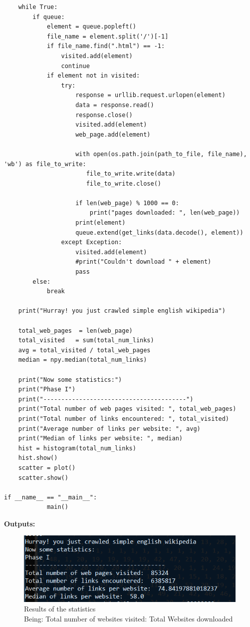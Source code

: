 \documentclass{WeSTassignment}
\begin{document}
\begin{lstlisting}
    while True:
        if queue:
            element = queue.popleft()
            file_name = element.split('/')[-1]
            if file_name.find(".html") == -1:
                visited.add(element)
                continue
            if element not in visited:
                try:
                    response = urllib.request.urlopen(element)
                    data = response.read()
                    response.close()
                    visited.add(element)
                    web_page.add(element)

                    with open(os.path.join(path_to_file, file_name), 'wb') as file_to_write:
                       file_to_write.write(data)
                       file_to_write.close()

                    if len(web_page) % 1000 == 0:
                        print("pages downloaded: ", len(web_page))
                    print(element)
                    queue.extend(get_links(data.decode(), element))
                except Exception:
                    visited.add(element)
                    #print("Couldn't download " + element)
                    pass
        else:
            break

    print("Hurray! you just crawled simple english wikipedia")

    total_web_pages  = len(web_page)
    total_visited   = sum(total_num_links)
    avg = total_visited / total_web_pages
    median = npy.median(total_num_links)

    print("Now some statistics:")
    print("Phase I")
    print("----------------------------------------")
    print("Total number of web pages visited: ", total_web_pages)
    print("Total number of links encountered: ", total_visited)
    print("Average number of links per website: ", avg)
    print("Median of links per website: ", median)
    hist = histogram(total_num_links)
    hist.show()
    scatter = plot()
    scatter.show()

if __name__ == "__main__":
            main()

\end{lstlisting}

\textbf{Outputs:}
\begin{figure}[h]
  \centering
  \includegraphics{statistics.png}
   \caption{Results of the statistics\\Being: Total number of websites visited: Total Websites downloaded}
     \label{fig:dig} 
\end{figure}
\end{document}
